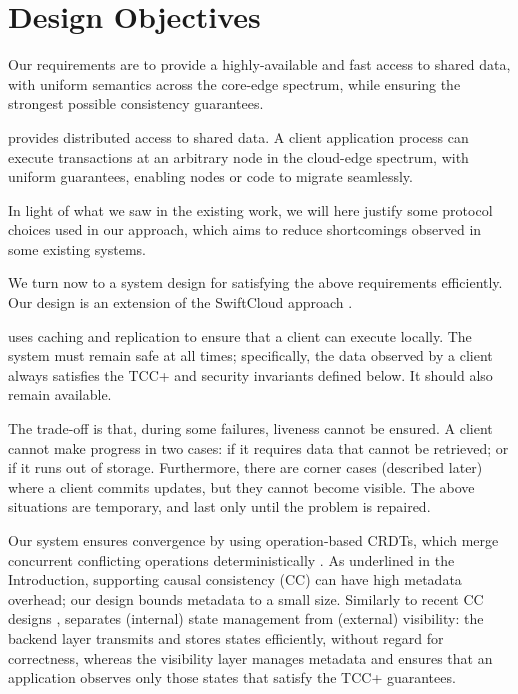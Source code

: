 
\section{Design Objectives}
\label{sec:design-objectives}

Our requirements are to provide a highly-available
and fast access to shared data, with uniform semantics across the
core-edge spectrum, while ensuring the strongest possible consistency
guarantees.

\system{} provides distributed access to shared data. A client
application process can execute transactions at an arbitrary node in
the cloud-edge spectrum, with uniform guarantees, enabling nodes or
code to migrate seamlessly.

In light of what we saw in the existing work, we will here justify
some protocol choices used in our approach, which aims to reduce shortcomings
observed in some existing systems.

We turn now to a system design for satisfying the above requirements
efficiently.
Our design is an extension of the SwiftCloud approach
\cite{rep:pan:sh177}.

\system{} uses caching and replication to ensure that a client can
execute locally.
The system must remain safe at all times; specifically, the data
observed by a client always satisfies the TCC+ and security invariants
defined below.
It should also remain available.

The trade-off is that, during some failures, liveness cannot be ensured.
A client cannot make progress in two cases: if it requires data that cannot be 
retrieved; or if it runs out of storage.
Furthermore, there are corner cases (described later) where a client
commits updates, but they cannot become visible.
The above situations are temporary, and last only until the problem is
repaired.

Our system ensures convergence by using operation-based CRDTs, which
merge concurrent conflicting operations deterministically \cite{syn:rep:sh143}.
As underlined in the Introduction, supporting causal consistency (CC)
can have high metadata overhead; our design bounds metadata to a small size.
Similarly to recent CC designs \cite{db:syn:1808, rep:pro:sh182},
\system{} separates (internal) state management from (external)
visibility: the backend layer transmits and stores states efficiently,
without regard for correctness, whereas the visibility layer manages
metadata and ensures that an application observes only those states that
satisfy the TCC+ guarantees.

